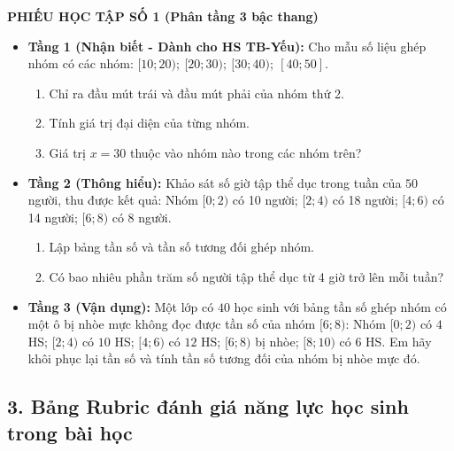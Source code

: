 \documentclass[12pt, a4paper]{article}
\begin{document}
\noindent \textbf{PHIẾU HỌC TẬP SỐ 1 (Phân tầng 3 bậc thang)}
\begin{itemize}[leftmargin=0.6cm]
    \item \textbf{Tầng 1 (Nhận biết - Dành cho HS TB-Yếu):}
    Cho mẫu số liệu ghép nhóm có các nhóm: $[10; 20); \ [20; 30); \ [30; 40); \ [40; 50]$.
    \begin{enumerate}[leftmargin=0.6cm]
        \item[a)] Chỉ ra đầu mút trái và đầu mút phải của nhóm thứ 2.
        \item[b)] Tính giá trị đại diện của từng nhóm.
        \item[c)] Giá trị $x = 30$ thuộc vào nhóm nào trong các nhóm trên?
    \end{enumerate}
    \item \textbf{Tầng 2 (Thông hiểu):}
    Khảo sát số giờ tập thể dục trong tuần của $50$ người, thu được kết quả:
    Nhóm $[0; 2)$ có 10 người; $[2; 4)$ có 18 người; $[4; 6)$ có 14 người; $[6; 8)$ có 8 người.
    \begin{enumerate}[leftmargin=0.6cm]
        \item[a)] Lập bảng tần số và tần số tương đối ghép nhóm.
        \item[b)] Có bao nhiêu phần trăm số người tập thể dục từ 4 giờ trở lên mỗi tuần?
    \end{enumerate}
    \item \textbf{Tầng 3 (Vận dụng):}
    Một lớp có $40$ học sinh với bảng tần số ghép nhóm có một ô bị nhòe mực không đọc được tần số của nhóm $[6; 8)$:
    Nhóm $[0; 2)$ có $4$ HS; $[2; 4)$ có $10$ HS; $[4; 6)$ có $12$ HS; $[6; 8)$ bị nhòe; $[8; 10)$ có $6$ HS.
    Em hãy khôi phục lại tần số và tính tần số tương đối của nhóm bị nhòe mực đó.
\end{itemize}

\subsection*{3. Bảng Rubric đánh giá năng lực học sinh trong bài học}
\end{document}
